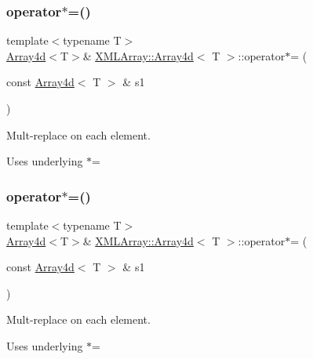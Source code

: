 \subsubsection{\texorpdfstring{operator$\ast$=()}{operator*=()}\hspace{0.1cm}{\footnotesize\ttfamily [1/6]}}
{\footnotesize\ttfamily template$<$typename T$>$ \\
\mbox{\hyperlink{classXMLArray_1_1Array4d}{Array4d}}$<$T$>$\& \mbox{\hyperlink{classXMLArray_1_1Array4d}{X\+M\+L\+Array\+::\+Array4d}}$<$ T $>$\+::operator$\ast$= (\begin{DoxyParamCaption}\item[{const \mbox{\hyperlink{classXMLArray_1_1Array4d}{Array4d}}$<$ T $>$ \&}]{s1 }\end{DoxyParamCaption})\hspace{0.3cm}{\ttfamily [inline]}}



Mult-\/replace on each element. 

Uses underlying $\ast$= \mbox{\label{classXMLArray_1_1Array4d_accb002ecd8742a2aba3e4acaf92963c6}} 
\subsubsection{\texorpdfstring{operator$\ast$=()}{operator*=()}\hspace{0.1cm}{\footnotesize\ttfamily [2/6]}}
{\footnotesize\ttfamily template$<$typename T$>$ \\
\mbox{\hyperlink{classXMLArray_1_1Array4d}{Array4d}}$<$T$>$\& \mbox{\hyperlink{classXMLArray_1_1Array4d}{X\+M\+L\+Array\+::\+Array4d}}$<$ T $>$\+::operator$\ast$= (\begin{DoxyParamCaption}\item[{const \mbox{\hyperlink{classXMLArray_1_1Array4d}{Array4d}}$<$ T $>$ \&}]{s1 }\end{DoxyParamCaption})\hspace{0.3cm}{\ttfamily [inline]}}



Mult-\/replace on each element. 

Uses underlying $\ast$= \mbox{\label{classXMLArray_1_1Array4d_accb002ecd8742a2aba3e4acaf92963c6}} 

